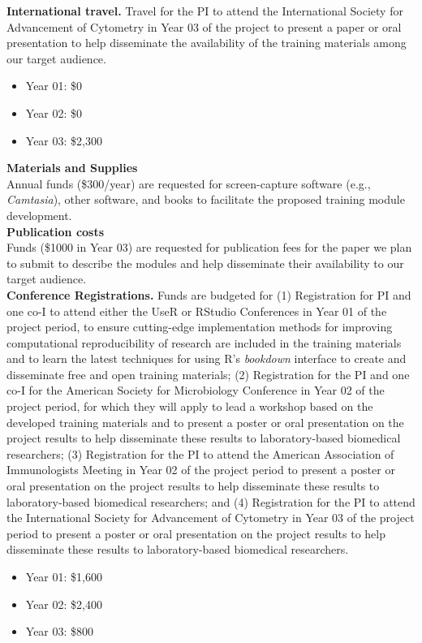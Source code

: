 \documentclass[pdftex,english,11pt,parskip=half]{scrartcl}
\begin{document}
\noindent \textbf{International travel.} Travel for the PI to attend the International Society for Advancement of Cytometry in Year 03 of the project to present a paper or oral presentation to help disseminate the availability of the training materials among our target audience. 
\begin{itemize}
\item Year 01: \$0
\item Year 02: \$0
\item Year 03: \$2,300
\end{itemize}

{\large \textbf{Materials and Supplies}} \\ Annual funds (\$300/year) are requested for screen-capture software (e.g., \textit{Camtasia}), other software, and books to facilitate the proposed training module development. \\

{\large \textbf{Publication costs}} \\ Funds (\$1000 in Year 03) are requested for publication fees for the paper we plan to submit to describe the modules and help disseminate their availability to our target audience. \\

\noindent \textbf{Conference Registrations.} Funds are budgeted for (1) Registration for PI and one co-I to attend either the UseR or RStudio Conferences in Year 01 of the project period, to ensure cutting-edge implementation methods for improving computational reproducibility of research are included in the training materials and to learn the latest techniques for using R's \textit{bookdown} interface to create and disseminate free and open training materials; (2) Registration for the PI and one co-I for the American Society for Microbiology Conference in Year 02 of the project period, for which they will apply to lead a workshop based on the developed training materials and to present a poster or oral presentation on the project results to help disseminate these results to laboratory-based biomedical researchers; (3) Registration for the PI to attend the American Association of Immunologists Meeting in Year 02 of the project period to present a poster or oral presentation on the project results to help disseminate these results to laboratory-based biomedical researchers; and (4) Registration for the PI to attend the International Society for Advancement of Cytometry in Year 03 of the project period to present a poster or oral presentation on the project results to help disseminate these results to laboratory-based biomedical researchers.
\begin{itemize}
\item Year 01: \$1,600
\item Year 02: \$2,400
\item Year 03: \$800
\end{itemize}
\end{document}
